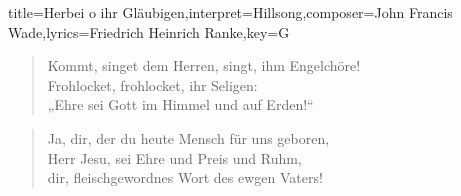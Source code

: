 \documentclass{leadsheet-modern}
\begin{document}
\begin{song}{title={Herbei o ihr Gläubigen},interpret={Hillsong},composer={John Francis Wade},lyrics={Friedrich Heinrich Ranke},key={G}}
\begin{verse}
Kommt, singet dem Herren, singt, ihm Engelchöre! \\
Frohlocket, frohlocket, ihr Seligen: \\
„Ehre sei Gott im Himmel und auf Erden!“ \\
\end{verse}

\begin{verse}
Ja, dir, der du heute Mensch für uns geboren, \\
Herr Jesu, sei Ehre und Preis und Ruhm, \\
dir, fleischgewordnes Wort des ewgen Vaters! 
\end{verse}

\end{song}
\end{document}
